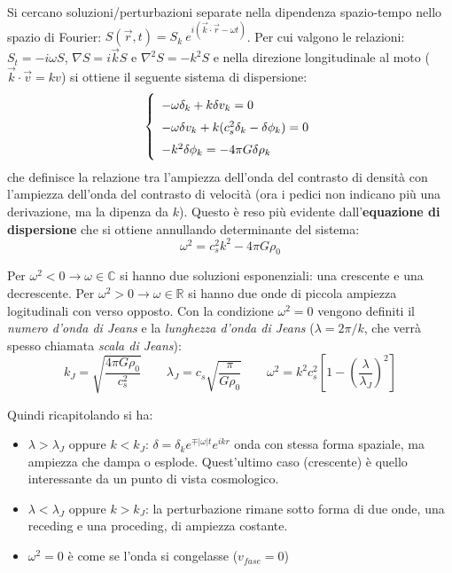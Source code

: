 Si cercano soluzioni/perturbazioni separate nella dipendenza spazio-tempo nello spazio di Fourier: $S(\vec{r},t)=S_k \: e^{i(\vec{k}\cdot\vec{r}-\omega t)}$. Per cui valgono le relazioni: $S_t = -i\omega S$, $\nabla S = i\vec{k}S$ e $\nabla^2 S= -k^2 S$ e nella direzione longitudinale al moto ($\vec{k}\cdot\vec{v}=kv$) si ottiene il seguente sistema di dispersione:
\begin{equation}\left\{
    \def\arraystretch{1.5}
        \begin{array}{l}
        - \omega \delta_k + k \delta v_k = 0 \\
        - \omega \delta v_k + k (c_s^2\delta_k -\delta\phi_k) = 0 \\
        - k^2 \delta\phi_k = -4\pi G\delta\rho_k
    \end{array}\right. 
\end{equation}
che definisce la relazione tra l'ampiezza dell'onda del contrasto di densità con l'ampiezza dell'onda del contrasto di velocità (ora i pedici non indicano più una derivazione, ma la dipenza da $k$). Questo è reso più evidente dall'\textbf{equazione di dispersione} che si ottiene annullando determinante del sistema:
\begin{equation}
    \omega^2 = c_s^2 k^2 - 4\pi G \rho_0 \label{eq:6disprelstatic}
\end{equation}

Per $\omega^2 < 0 \rightarrow \omega \in \mathbb{C}$ si hanno due soluzioni esponenziali: una crescente e una decrescente. Per $\omega^2 > 0 \rightarrow \omega \in \mathbb{R}$ si hanno due onde di piccola ampiezza logitudinali con verso opposto. Con la condizione $\omega^2 = 0$ vengono definiti il \textit{numero d'onda di Jeans} e la \textit{lunghezza d'onda di Jeans} ($\lambda=2\pi /k$, che verrà spesso chiamata \textit{scala di Jeans}):
\begin{equation}
k_J = \sqrt{\frac{4\pi G \rho_0}{c_s^2}} \qquad \lambda_J=c_s\sqrt{\frac{\pi}{G\rho_0}} \qquad \omega^2=k^2 c_s^2 \left[1- \left(\frac{\lambda}{\lambda_J}\right)^2\right]
\end{equation}

Quindi ricapitolando si ha:
\begin{itemize}
    \item $\lambda >\lambda_J$ oppure $k<k_J$: $\delta = \delta_k e^{\mp |\omega| t}e^{ikr} $ onda con stessa forma spaziale, ma ampiezza che dampa o esplode. Quest'ultimo caso (crescente) è quello interessante da un punto di vista cosmologico.
    \item $\lambda <\lambda_J$ oppure $k>k_J$: la perturbazione rimane sotto forma di due onde, una receding e una proceding, di ampiezza costante.
    \item $\omega^2=0$ è come se l'onda si congelasse ($v_{fase}=0$)
\end{itemize}

